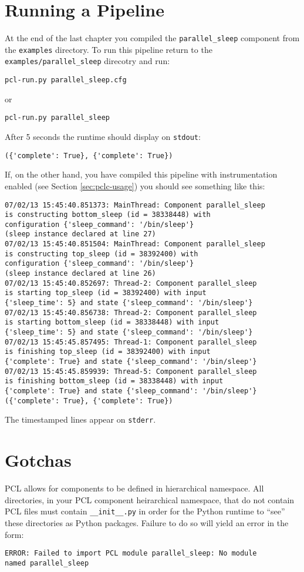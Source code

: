 \section{Running a Pipeline}
At the end of the last chapter you compiled the \texttt{parallel\_sleep} component from the \texttt{examples} directory. To run this pipeline return to the \texttt{examples/parallel\_sleep} direcotry and run:
\begin{verbatim}
pcl-run.py parallel_sleep.cfg
\end{verbatim}
or
\begin{verbatim}
pcl-run.py parallel_sleep
\end{verbatim}
After 5 seconds the runtime should display on \texttt{stdout}:
\begin{verbatim}
({'complete': True}, {'complete': True})
\end{verbatim}

If, on the other hand, you have compiled this pipeline with instrumentation enabled (see Section \ref{sec:pclc-usage}) you should see something like this:
\begin{verbatim}
07/02/13 15:45:40.851373: MainThread: Component parallel_sleep
is constructing bottom_sleep (id = 38338448) with
configuration {'sleep_command': '/bin/sleep'}
(sleep instance declared at line 27)
07/02/13 15:45:40.851504: MainThread: Component parallel_sleep
is constructing top_sleep (id = 38392400) with
configuration {'sleep_command': '/bin/sleep'}
(sleep instance declared at line 26)
07/02/13 15:45:40.852697: Thread-2: Component parallel_sleep
is starting top_sleep (id = 38392400) with input
{'sleep_time': 5} and state {'sleep_command': '/bin/sleep'}
07/02/13 15:45:40.856738: Thread-2: Component parallel_sleep
is starting bottom_sleep (id = 38338448) with input
{'sleep_time': 5} and state {'sleep_command': '/bin/sleep'}
07/02/13 15:45:45.857495: Thread-1: Component parallel_sleep
is finishing top_sleep (id = 38392400) with input
{'complete': True} and state {'sleep_command': '/bin/sleep'}
07/02/13 15:45:45.859939: Thread-5: Component parallel_sleep
is finishing bottom_sleep (id = 38338448) with input
{'complete': True} and state {'sleep_command': '/bin/sleep'}
({'complete': True}, {'complete': True})
\end{verbatim}
The timestamped lines appear on \texttt{stderr}.

\section{Gotchas}
PCL allows for components to be defined in hierarchical namespace. All directories, in your PCL component heirarchical namespace, that do not contain PCL files must contain \texttt{\_\_init\_\_.py} in order for the Python runtime to ``see'' these directories as Python packages. Failure to do so will yield an error in the form:
\begin{verbatim}
ERROR: Failed to import PCL module parallel_sleep: No module
named parallel_sleep
\end{verbatim}

